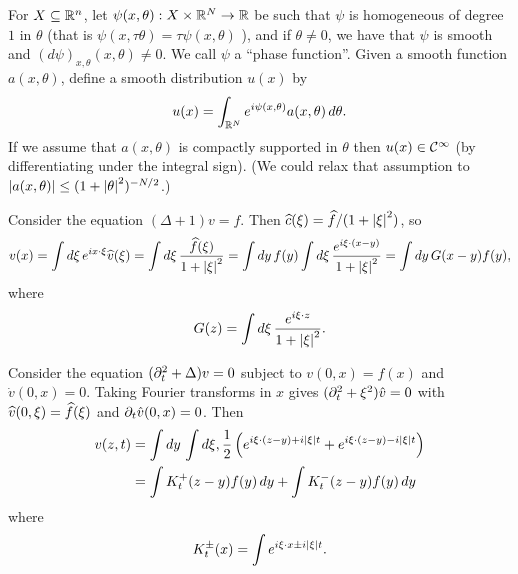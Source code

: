 For $X\subseteq\mathbb{R}^n$, let $\psi(x,\theta): X \times \mathbb{R}^N \to \mathbb{R}$ be such that $\psi$ is homogeneous of degree $1$ in $\theta$ (that is $\psi(x,\tau\theta)=\tau\psi(x,\theta)$ ), and if $\theta\neq0$, we have that $\psi$ is smooth and $(d\psi)_{x,\theta}(x,\theta)\neq0$.
We call $\psi$ a ``phase function''.
Given a smooth function $a(x,\theta)$, define a smooth distribution $u(x)$ by
\begin{equation}
  u(x) = \int_{\mathbb{R}^N} e^{i\psi(x,\theta)}a(x,\theta)\,d\theta.
  \label{20:star}
\end{equation}
If we assume that $a(x,\theta)$ is compactly supported in $\theta$ then $u(x)\in\mathcal{C}^\infty$ (by differentiating under the integral sign).
(We could relax that assumption to $\left\lvert a(x,\theta) \right\rvert\leq(1+\left\lvert \theta \right\rvert^2)^{-N/2}$.)

\begin{exam}
  Consider the equation $(\Delta+1)v=f$.
  Then $\widehat c(\xi) = \widehat f/(1+\left\lvert \xi \right\rvert^2)$, so
  \[ v(x) = \int d\xi\, e^{ix\cdot\xi}\widehat v(\xi) = \int d\xi\, \frac{\widehat f(\xi)}{1+\left\lvert \xi \right\rvert^2} = \int dy\, f(y) \int d\xi\, \frac{e^{i\xi\cdot(x-y)}}{1+\left\lvert \xi \right\rvert^2} = \int dy\, G(x-y)f(y), \]
  where
  \[ G(z) = \int d\xi\, \frac{e^{i\xi\cdot z}}{1+\left\lvert \xi \right\rvert^2}. \]
\end{exam}

\begin{exam}
  Consider the equation $(\partial_t^2+\Delta)v=0$ subject to $v(0,x)=f(x)$ and $\dot v(0,x)=0$.
  Taking Fourier transforms in $x$ gives $(\partial_t^2+\xi^2)\hat v=0$ with $\widehat v(0,\xi)=\widehat f(\xi)$ and $\partial_t\hat v(0,x)=0$.
  Then
  \begin{align*}
    v(z,t) &= \int dy\, \int d\xi, \frac12\left( e^{i\xi\cdot(z-y)+i\left\lvert \xi \right\rvert t} + e^{i\xi\cdot(z-y)-i\left\lvert \xi \right\rvert t} \right) \\
    &= \int K_t^+(z-y) f(y) \, dy + \int K_t^-(z-y) f(y) \, dy
  \end{align*}
  where
  \[ K_t^\pm(x) = \int e^{i\xi\cdot x\pm i\left\lvert \xi \right\rvert t}. \]
\end{exam}
